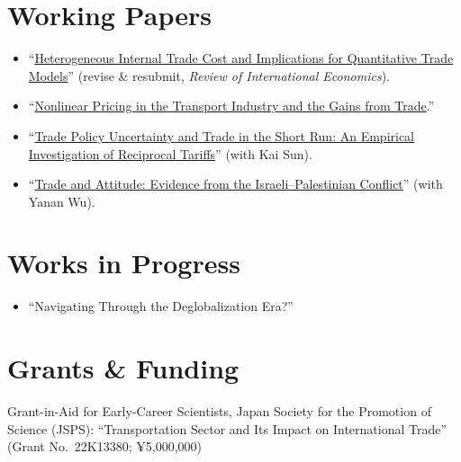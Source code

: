 \documentclass[11pt]{article}
\newcommand{\dated}[2]{\noindent
  \begin{minipage}[t]{\dimexpr\textwidth-8em\relax}\raggedright #1\end{minipage}%
  \hfill\makebox[7em][r]{#2}\par\smallskip}
\begin{document}
\section{Working Papers}
\begin{itemize}
  \item ``\href{https://drive.google.com/file/d/1aOkB6xR4RfEGhjzCr4wXoZq_zHC-ejgV/view?usp=sharing}{Heterogeneous Internal Trade Cost and Implications for Quantitative Trade Models}''
        (revise \& resubmit, \textit{Review of International Economics}).
  \item ``\href{https://drive.google.com/file/d/1EOCs1o3Kzju8eDf6ygcZmww_R_iJu6fj/view?usp=sharing}{Nonlinear Pricing in the Transport Industry and the Gains from Trade}.''
  \item ``\href{https://drive.google.com/file/d/1ojNEOnEFDC_Dc9CEDPtt5hEaURMaku3V/view?usp=drive_link}{Trade Policy Uncertainty and Trade in the Short Run: An Empirical Investigation of Reciprocal Tariffs}'' (with Kai Sun).
  \item ``\href{https://drive.google.com/file/d/1X5x6oyQzN9_MSwF66VibaeOHXIXWpQVn/view?usp=sharing}{Trade and Attitude: Evidence from the Israeli--Palestinian Conflict}'' (with Yanan Wu).
\end{itemize}

\section{Works in Progress}
\begin{itemize}
  \item ``Navigating Through the Deglobalization Era?''
\end{itemize}

\section{Grants \& Funding}
\dated{Grant-in-Aid for Early-Career Scientists, Japan Society for the Promotion of Science (JSPS):
``Transportation Sector and Its Impact on International Trade'' (Grant No.\ 22K13380; ¥5,000,000)}{2022--2026}

\end{document}
